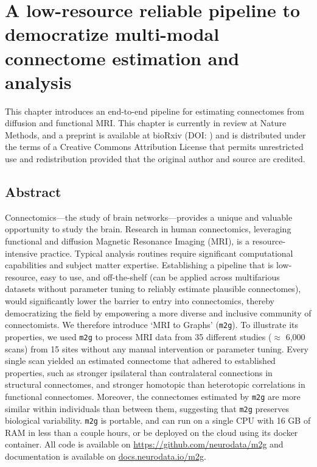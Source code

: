 \chapter[MRI to Connectomes]{A low-resource reliable pipeline to democratize multi-modal connectome estimation and analysis} \label{chap:m2g}

This chapter introduces an end-to-end pipeline for estimating connectomes from diffusion and functional MRI. This chapter is currently in review at Nature Methods, and a preprint is available at bioRxiv (DOI: \url{}) and is distributed under the terms of a Creative Commons Attribution License that permits unrestricted use and redistribution provided that the original author and source are credited.

\pagebreak 
\section*{Abstract}
Connectomics---the study of brain networks---provides a unique and valuable opportunity to study the brain. Research in human connectomics, leveraging functional and diffusion Magnetic Resonance Imaging (MRI), is a resource-intensive practice. Typical analysis routines require significant computational capabilities and subject matter expertise. Establishing a pipeline that is low-resource, easy to use, and off-the-shelf  (can be applied across multifarious datasets without parameter tuning to reliably estimate plausible connectomes), would significantly lower the barrier to entry into connectomics, thereby democratizing the field by empowering a more diverse and inclusive community of connectomists. We therefore introduce `MRI to Graphs' (\texttt{m2g}). To illustrate its properties, we used \texttt{m2g} to process MRI data from 35 different studies ($\approx$ 6,000 scans) from 15 sites without any manual intervention or parameter tuning. Every single scan yielded an estimated connectome that adhered to established properties, such as  stronger ipsilateral than contralateral connections in structural connectomes, and stronger homotopic than heterotopic correlations in functional connectomes. Moreover, the connectomes estimated by \texttt{m2g} are more similar within individuals than between them, suggesting that \texttt{m2g} preserves biological variability. \texttt{m2g} is portable, and can run on a single CPU with 16 GB of RAM in less than a couple hours, or be deployed on the cloud using its docker container. All code is available on \url{https://github.com/neurodata/m2g} and documentation is available on \url{docs.neurodata.io/m2g}.
\pagebreak

